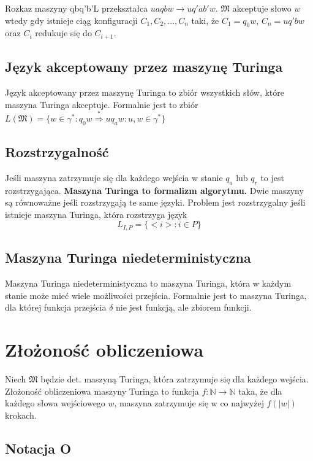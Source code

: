 \documentclass{../notatki}
\begin{document}
Rozkaz maszyny qbq'b'L przekształca $uaqbw \rightarrow uq'ab'w$. $\mathfrak{M}$
akceptuje słowo $w$ wtedy gdy istnieje ciąg konfiguracji $C_1, C_2, \dots, C_n$
taki, że $C_1 = q_0w$, $C_n = uq'bw$ oraz $C_i$ redukuje się do $C_{i+1}$.

\subsection{Język akceptowany przez maszynę Turinga}

Język akceptowany przez maszynę Turinga to zbiór wszystkich słów, które
maszyna Turinga akceptuje. Formalnie jest to zbiór $L(\mathfrak{M}) = \{w \in
\gamma^* : q_0w \stackrel{*}{\Rightarrow} uq_aw : u, w \in \gamma^*\}$

\subsection{Rozstrzygalność}

Jeśli maszyna zatrzymuje się dla każdego wejścia w stanie $q_a$ lub $q_r$ to
jest rozstrzygająca. \textbf{Maszyna Turinga to formalizm algorytmu.} Dwie
maszyny są równoważne jeśli rozstrzygają te same języki. Problem jest
rozstrzygalny jeśli istnieje maszyna Turinga, która rozstrzyga język
$$
L_{I,P} = \{<i>: i \in P\}
$$

\subsection{Maszyna Turinga niedeterministyczna}

Maszyna Turinga niedeterministyczna to maszyna Turinga, która w każdym stanie
może mieć wiele możliwości przejścia. Formalnie jest to maszyna Turinga, dla
której funkcja przejścia $\delta$ nie jest funkcją, ale zbiorem funkcji.

\section{Złożoność obliczeniowa}

Niech $\mathfrak{M}$ będzie det. maszyną Turinga, która zatrzymuje się dla
każdego wejścia. Złożoność obliczeniowa maszyny Turinga to funkcja
$f: \mathbb{N} \rightarrow \mathbb{N}$ taka, że dla każdego słowa
wejściowego $w$, maszyna zatrzymuje się w co najwyżej $f(|w|)$ krokach.

\subsection{Notacja O}
\end{document}
